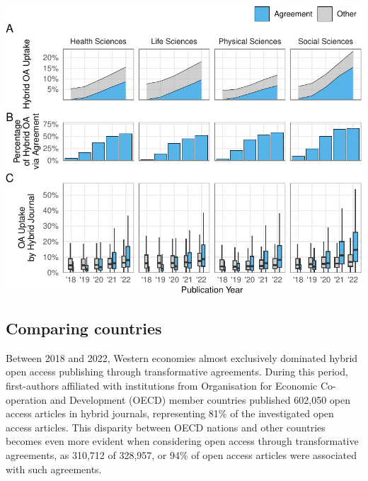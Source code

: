 \documentclass[a4paper,man,floatsintext,longtable,noextraspace,12pt]{apa6}
\begin{document}
\begin{center}\includegraphics[width=0.99\linewidth]{fig/subject_panel-1} \end{center}

\hypertarget{comparing-countries}{%
\subsection{Comparing countries}\label{comparing-countries}}

Between 2018 and 2022, Western economies almost exclusively dominated
hybrid open access publishing through transformative agreements. During
this period, first-authors affiliated with institutions from
Organisation for Economic Co-operation and Development (OECD) member
countries published 602,050 open access articles in hybrid journals,
representing 81\% of the investigated open access articles. This
disparity between OECD nations and other countries becomes even more
evident when considering open access through transformative agreements,
as 310,712 of 328,957, or 94\% of open access articles were associated
with such agreements.
\end{document}
